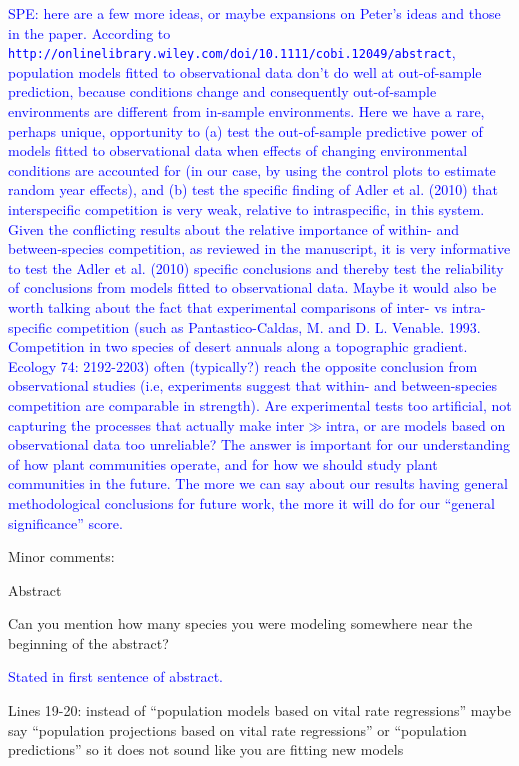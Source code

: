 \documentclass[12pt]{article}
\newcommand{\response}{\textcolor{blue}}
\begin{document}
\response{SPE: here are a few more ideas, or maybe expansions on Peter's ideas and those in the paper. According to \texttt{http://onlinelibrary.wiley.com/doi/10.1111/cobi.12049/abstract}, 
population models fitted to observational data don't do well at out-of-sample prediction, because
conditions change and consequently out-of-sample environments are different from in-sample environments. Here we have a rare, perhaps unique, opportunity to (a) test the out-of-sample 
predictive power of models fitted to observational data when effects of changing environmental conditions are accounted for (in our case, by using the control plots to estimate random year effects), 
and (b) test the specific finding of Adler et al. (2010) that interspecific competition is very weak, relative to intraspecific, in this system. Given the conflicting results 
about the relative importance of within- and between-species competition, as reviewed in the manuscript, 
it is very informative to test the Adler et al. (2010) specific conclusions and thereby test the reliability of conclusions from models fitted to observational
data. Maybe it would also be worth talking about the fact that experimental comparisons of inter- vs intra-specific competition (such as Pantastico-Caldas, M. and D. L. Venable. 1993. 
Competition in two species of desert annuals along a topographic gradient. Ecology 74: 2192-2203) often (typically?) reach the opposite conclusion from observational studies (i.e, experiments
suggest that within- and between-species competition are comparable in strength). Are experimental tests too artificial, not capturing the processes that actually make inter$\gg$intra, or are 
models based on observational data too unreliable? The answer is important for our understanding of how plant communities operate, and for how we should study plant communities in the future.
The more we can say about our results having general methodological conclusions for future work, the more it will do for our ``general significance'' score.} 

Minor comments:

Abstract

Can you mention how many species you were modeling somewhere near the beginning of the abstract?

\response{Stated in first sentence of abstract.}

Lines 19-20: instead of “population models based on vital rate regressions” maybe say “population projections based on vital rate regressions” or “population predictions” so it does not sound like you are fitting new models
\end{document}
